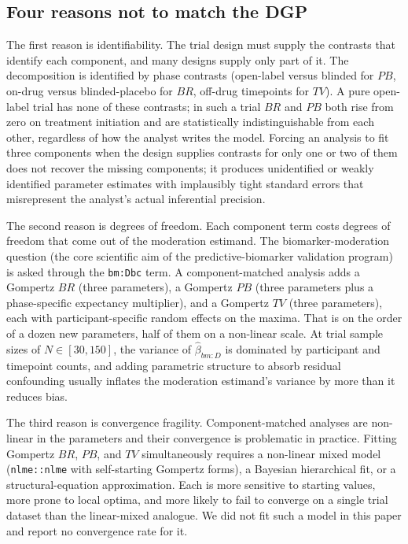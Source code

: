 \documentclass[
  11pt,
]{article}
\newcounter{none} %
\begin{document}
\subsection{Four reasons not to match the DGP}\label{four-reasons-not-to-match-the-dgp}

The first reason is identifiability. The trial design must supply the
contrasts that identify each component, and many designs supply only part of
it. The decomposition is identified by phase contrasts (open-label versus
blinded for \(PB\), on-drug versus blinded-placebo for \(BR\), off-drug timepoints
for \(TV\)). A pure open-label trial has none of these contrasts; in such a
trial \(BR\) and \(PB\) both rise from zero on treatment initiation and are
statistically indistinguishable from each other, regardless of how the analyst
writes the model. Forcing an analysis to fit three components when the design
supplies contrasts for only one or two of them does not recover the missing
components; it produces unidentified or weakly identified parameter estimates
with implausibly tight standard errors that misrepresent the analyst's actual
inferential precision.

The second reason is degrees of freedom. Each component term costs degrees of
freedom that come out of the moderation estimand. The biomarker-moderation
question (the core scientific aim of the predictive-biomarker validation
program) is asked through the \texttt{bm:Dbc} term. A component-matched
analysis adds a Gompertz \(BR\) (three parameters), a Gompertz \(PB\) (three
parameters plus a phase-specific expectancy multiplier), and a Gompertz \(TV\)
(three parameters), each with participant-specific random effects on the
maxima. That is on the order of a dozen new parameters, half of them on a
non-linear scale. At trial sample sizes of \(N \in [30, 150]\), the variance of
\(\hat{\beta}_{bm:D}\) is dominated by participant and timepoint counts, and
adding parametric structure to absorb residual confounding usually inflates
the moderation estimand's variance by more than it reduces bias.

The third reason is convergence fragility. Component-matched analyses are
non-linear in the parameters and their convergence is problematic in practice.
Fitting Gompertz \(BR\), \(PB\), and \(TV\) simultaneously requires a non-linear
mixed model (\texttt{nlme::nlme} with self-starting Gompertz forms), a
Bayesian hierarchical fit, or a structural-equation approximation. Each is
more sensitive to starting values, more prone to local optima, and more likely
to fail to converge on a single trial dataset than the linear-mixed analogue.
We did not fit such a model in this paper and report no convergence rate
for it.
\end{document}
